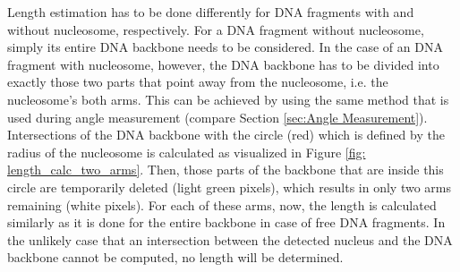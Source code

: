\documentclass{article}
\begin{document}
Length estimation has to be done differently for DNA fragments with and without nucleosome, respectively. For a DNA fragment without nucleosome, simply its entire DNA backbone needs to be considered. In the case of an DNA fragment with nucleosome, however, the DNA backbone has to be divided into exactly those two parts that point away from the nucleosome, i.e. the nucleosome's both arms. 
This can be achieved by using the same method that is used during angle measurement (compare Section \ref{sec:Angle Measurement}). Intersections of the DNA backbone with the circle (red) which is defined by the radius of the nucleosome is calculated as visualized in Figure \ref{fig: length_calc_two_arms}. Then, those parts of the backbone that are inside this circle are temporarily deleted (light green pixels), which results in only two arms remaining (white pixels). For each of these arms, now, the length is calculated similarly as it is done for the entire backbone in case of free DNA fragments. In the unlikely case that an intersection between the detected nucleus and the DNA backbone cannot be computed, no length will be determined.
\end{document}
